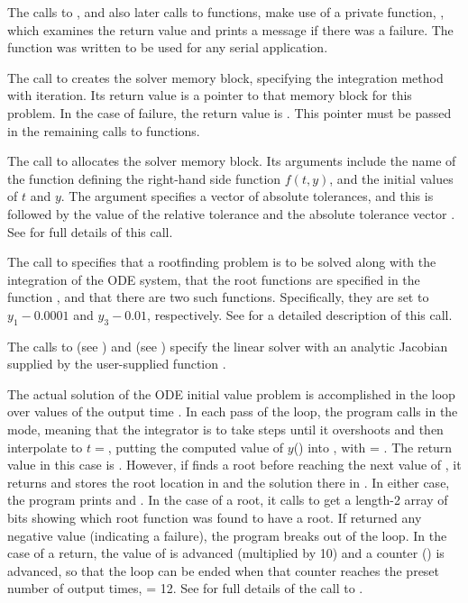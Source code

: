 The calls to , and also later calls to 
functions, make use of a private function, , which examines
the return value and prints a message if there was a failure.  The
 function was written to be used for any serial {\sundials}
application.

The call to  creates the {\cvode} solver memory block,
specifying the  integration method with  iteration.
Its return value is a pointer to that memory block for this
problem.  In the case of failure, the return value is .  This
pointer must be passed in the remaining calls to {\cvode} functions.

The call to  allocates the solver memory block.
Its arguments include the name of the {\C} function  defining the
right-hand side function $f(t,y)$, and the initial values of $t$ and $y$.
The argument  specifies a vector of absolute tolerances, and this 
is followed by the value of the relative tolerance  and the absolute 
tolerance vector .
See  for full details of this call.

The call to  specifies that a rootfinding problem
is to be solved along with the integration of the ODE system, that the
root functions are specified in the function , and that there are
two such functions.  Specifically, they are set to $y_1 - 0.0001$ and 
$y_3 - 0.01$, respectively.
See  for a detailed description of this call.

The calls to  (see ) and 
 (see ) specify the {\cvdense}
linear solver with an analytic Jacobian supplied by the user-supplied function
.

The actual solution of the ODE initial value problem is accomplished in
the loop over values of the output time .  In each pass of the
loop, the program calls  in the  mode, meaning that
the integrator is to take steps until it overshoots  and then
interpolate to $t = $, putting the computed value of $y$()
into , with  = .  The return value in this case is
.  However, if  finds a root before reaching the next
value of , it returns  and stores the root
location in  and the solution there in .  In either case, the
program prints  and .  In the case of a root, it calls
 to get a length-2 array  of bits showing
which root function was found to have a root.  If  returned any
negative value (indicating a failure), the program breaks out of the loop.  
In the case of a  return, the value of  is
advanced (multiplied by 10) and a counter () is advanced, so
that the loop can be ended when that counter reaches the preset number
of output times,  = 12.  See  for full
details of the call to .

